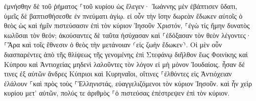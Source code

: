 \documentclass{openreader}
\begin{document}
ἐμνήσθην δὲ τοῦ ῥήματος ⸀τοῦ κυρίου ὡς ἔλεγεν· Ἰωάννης μὲν ἐβάπτισεν ὕδατι, ὑμεῖς δὲ βαπτισθήσεσθε ἐν πνεύματι ἁγίῳ. 
εἰ οὖν τὴν ἴσην δωρεὰν ἔδωκεν αὐτοῖς ὁ θεὸς ὡς καὶ ἡμῖν πιστεύσασιν ἐπὶ τὸν κύριον Ἰησοῦν Χριστόν, ⸀ἐγὼ τίς ἤμην δυνατὸς κωλῦσαι τὸν θεόν; 
ἀκούσαντες δὲ ταῦτα ἡσύχασαν καὶ ⸀ἐδόξασαν τὸν θεὸν λέγοντες· ⸀Ἄρα καὶ τοῖς ἔθνεσιν ὁ θεὸς τὴν μετάνοιαν ⸂εἰς ζωὴν ἔδωκεν⸃. 
Οἱ μὲν οὖν διασπαρέντες ἀπὸ τῆς θλίψεως τῆς γενομένης ἐπὶ Στεφάνῳ διῆλθον ἕως Φοινίκης καὶ Κύπρου καὶ Ἀντιοχείας μηδενὶ λαλοῦντες τὸν λόγον εἰ μὴ μόνον Ἰουδαίοις. 
ἦσαν δέ τινες ἐξ αὐτῶν ἄνδρες Κύπριοι καὶ Κυρηναῖοι, οἵτινες ⸀ἐλθόντες εἰς Ἀντιόχειαν ἐλάλουν ⸀καὶ πρὸς τοὺς ⸀Ἑλληνιστάς, εὐαγγελιζόμενοι τὸν κύριον Ἰησοῦν. 
καὶ ἦν χεὶρ κυρίου μετ’ αὐτῶν, πολύς τε ἀριθμὸς ⸀ὁ πιστεύσας ἐπέστρεψεν ἐπὶ τὸν κύριον. 
\end{document}
